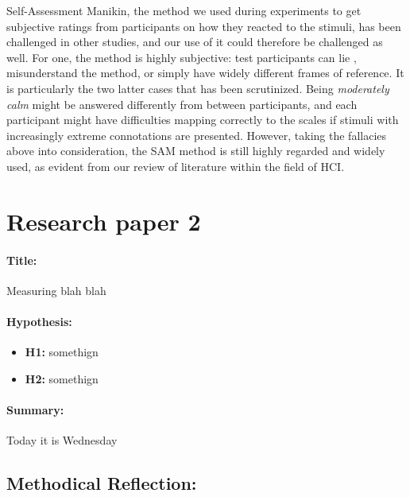 Self-Assessment Manikin, the method we used during experiments to get subjective
ratings from participants on how they reacted to the stimuli, has been
challenged in other studies, and our use of it could therefore be challenged as
well. For one, the method is highly subjective: test participants can lie ,
misunderstand the method, or simply have widely different frames of
reference. It is particularly the two latter cases that has been
scrutinized. Being \textit{moderately calm} might be answered differently from
between participants, and each participant might have difficulties mapping
correctly to the scales if stimuli with increasingly extreme connotations are
presented. However, taking the fallacies above into consideration, the SAM
method is still highly regarded and widely used, as evident from our review of
literature within the field of HCI.


\section{Research paper 2}
\paragraph{Title:}
Measuring blah blah
\paragraph{Hypothesis:}
\begin{itemize}
    \item \textbf{H1:} somethign
    \item \textbf{H2:} somethign
\end{itemize}
\paragraph{Summary:} Today it is Wednesday
\subsection{Methodical Reflection:}


